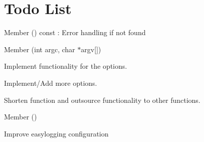 \chapter{Todo List}
\hypertarget{todo}{}\label{todo}

\begin{DoxyRefList}
\item[Member \doxylink{classjson_1_1JSONHandler_a73c49efaca3076cc6c6778522783a841}{json\+::JSONHandler\+::assign\+Hide\+Shell} () const]\label{todo__todo000003}%
%
\+: Error handling if not found  
\item[Member \doxylink{classutils_1_1StartupHandler_a9cdd57841cee245c1a1c94b0efe6549c}{utils\+::Startup\+Handler\+::get\+Options} (int argc, char \texorpdfstring{$\ast$}{*}argv\mbox{[}\mbox{]})]\label{todo__todo000002}%
%

\begin{DoxyItemize}
\item Implement functionality for the options.
\item Implement/\+Add more options.
\item Shorten function and outsource functionality to other functions. 
\end{DoxyItemize}
\item[Member \doxylink{classutils_1_1StartupHandler_ade70b280d4385f270829b177da44b169}{utils\+::Startup\+Handler\+::init\+Easy\+Logging} ()]\label{todo__todo000001}%
%

\begin{DoxyItemize}
\item Improve easylogging configuration
\end{DoxyItemize}
\end{DoxyRefList}